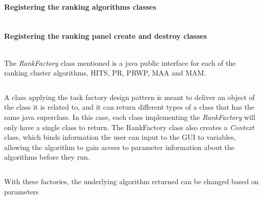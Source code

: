 \paragraph{Registering the ranking algorithms classes}
\inputminted[linenos,fontsize=\scriptsize,firstline=65,lastline=93]{java}{../ranklust/src/main/java/edu/ucsf/rbvi/clusterMaker2/internal/CyActivator.java}

\paragraph{Registering the ranking panel create and destroy classes}
\inputminted[linenos,fontsize=\scriptsize,firstline=173,lastline=180]{java}{../ranklust/src/main/java/edu/ucsf/rbvi/clusterMaker2/internal/CyActivator.java}

The \textit{RankFactory} class mentioned is a java public interface for each of
the ranking cluster algorithms, HITS, PR, PRWP, MAA and MAM. 

\inputminted[linenos,fontsize=\scriptsize,firstline=3,lastline=10]{java}{../ranklust/src/main/java/edu/ucsf/rbvi/clusterMaker2/internal/api/RankFactory.java}

A class applying the task factory design pattern is meant to deliver an object
of the class it is related to\cite{factory-design}, and it can return different
types of a class that has the same java superclass\cite{java-superclass}. In
this case, each class implementing the \textit{RankFactory} will only have a
single class to return. The RankFactory class also creates a \textit{Context}
class, which binds information the user can input to the GUI to variables,
allowing the algorithm to gain access to parameter information about the
algorithms before they run.

\inputminted[linenos,fontsize=\scriptsize,firstline=144,lastline=149]{java}{../ranklust/src/main/java/edu/ucsf/rbvi/clusterMaker2/internal/CyActivator.java}

With these factories, the underlying algorithm returned can be changed based on
parameters

\inputminted[linenos,fontsize=\scriptsize,firstline=186,lastline=207]{java}{../ranklust/src/main/java/edu/ucsf/rbvi/clusterMaker2/internal/ClusterManagerImpl.java}

\inputminted[linenos,fontsize=\scriptsize,firstline=260,lastline=282]{java}{../ranklust/src/main/java/edu/ucsf/rbvi/clusterMaker2/internal/ClusterManagerImpl.java}
